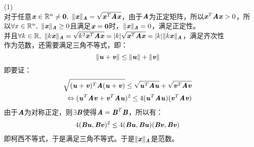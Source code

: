 \documentclass{article}
\newcommand{\xc}[1]{\textbf{\emph{#1}}}
\begin{document}
\begin{itemize}
		(1)\\
		对于任意$\xc{x}\in \mathbb{R}^{n} \ne \textbf{0}, \,\, \|\xc{x}\|_{\xc{A}} = \sqrt{\xc{x}^{T}\xc{A}\xc{x}}$，由于$\xc{A}$为正定矩阵，所以$\xc{x}^{T}\xc{A}\xc{x} > 0$，所以$\forall x\in \mathbb{R}^{n}, \,\, \|\xc{x}\|_{\xc{A}} \ge 0$且满足$\xc{x} = \textbf{0}$时，$\|\xc{x}\|_{\xc{A}} = 0$，满足正定性。\\
		并且$\forall k \in \mathbb{R},\,\,\|k\xc{x}\|_{\xc{A}} = \sqrt{k^2\xc{x}^{T}\xc{A}\xc{x}} = |k|\sqrt{\xc{x}^{T}\xc{A}\xc{x}} = |k|\|k\xc{x}\|_{\xc{A}}$，满足齐次性\\
		作为范数，还需要满足三角不等式，即：
		$$
			\|\xc{u} + \xc{v}\| \le \|\xc{u}\| + \|\xc{v}\|
		$$
		即要证：
		\begin{align*}
			\sqrt{(\xc{u} +\xc{v})^{T}\xc{A}(\xc{u} + \xc{v})} \le \sqrt{\xc{u}^{T}\xc{A}\xc{u}}+\sqrt{\xc{v}^{T}\xc{A}\xc{v}}\\
			\Leftrightarrow (\xc{u}^{T}\xc{A}\xc{v} + \xc{v}^{T}\xc{A}\xc{u})^2 \le 4(\xc{u}^T\xc{A}\xc{u})(\xc{v}^{T}\xc{A}\xc{v})
		\end{align*}
		由于$\xc{A}$为对称正定，则$\exists\xc{B}$使得$\xc{A} = \xc{B}^{T}\xc{B}$，所以有：
		\begin{align*}
			4(\xc{Bu}, \xc{Bv})^2 \le 4(\xc{Bu},\xc{Bu})(\xc{Bv},\xc{Bv})
		\end{align*}
		即柯西不等式，于是满足三角不等式。于是$\|\xc{x}\|_{\xc{A}} $是范数。\\
		

\end{itemize}
\end{document}
